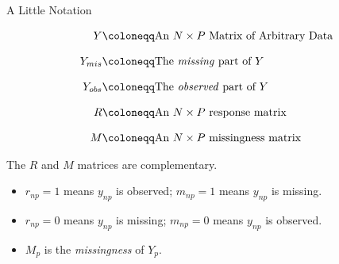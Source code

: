 \documentclass{beamer}\usepackage[]{graphicx}\usepackage[]{color}
\begin{document}

\begin{frame}{A Little Notation}
  
  \begin{align*}
    Y &\coloneqq \text{An $N \times P$ Matrix of Arbitrary Data}\\[8pt]
    Y_{mis} &\coloneqq \text{The \emph{missing} part of $Y$}\\[8pt]
    Y_{obs} &\coloneqq \text{The \emph{observed} part of $Y$}\\[8pt]
    R &\coloneqq \text{An $N \times P$ response matrix}\\[8pt]
    M &\coloneqq \text{An $N \times P$ missingness matrix}
  \end{align*}
  
  The $R$ and $M$ matrices are complementary.
  \begin{itemize}
  \item $r_{np} = 1$ means $y_{np}$ is observed; $m_{np} = 1$ means $y_{np}$ is 
    missing.
  \item $r_{np} = 0$ means $y_{np}$ is missing; $m_{np} = 0$ means $y_{np}$ is 
    observed.
  \item $M_p$ is the \emph{missingness} of $Y_p$.
  \end{itemize}
  
\end{frame}

    

\end{document}
